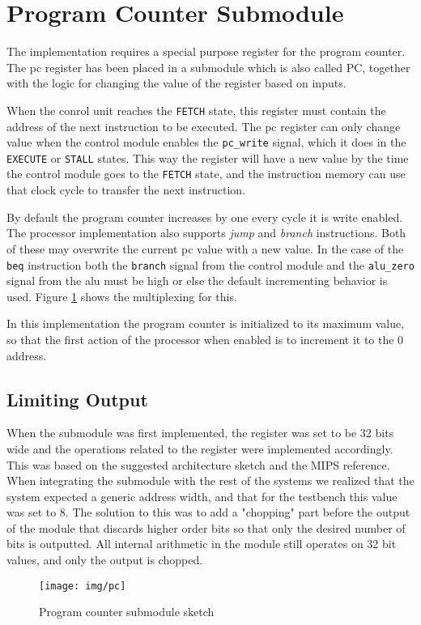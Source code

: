 \section{Program Counter Submodule}
The implementation requires a special purpose register for the program counter.
The \gls{pc} register has been placed in a submodule which is also called PC,
together with the logic for changing the value of the register based on inputs.

When the conrol unit reaches the \texttt{FETCH} state,
this register must contain the address of the next instruction to be executed.
The \gls{pc} register can only change value when the control module enables the \texttt{pc\_write} signal,
which it does in the \texttt{EXECUTE} or \texttt{STALL} states.
This way the register will have a new value by the time the control module goes to the \texttt{FETCH} state,
and the instruction memory can use that clock cycle to transfer the next instruction.

By default the program counter increases by one every cycle it is write enabled.
The processor implementation also supports \textit{jump} and \textit{branch} instructions.
Both of these may overwrite the current \gls{pc} value with a new value.
In the case of the \texttt{beq} instruction both the \texttt{branch} signal from the control module and the \texttt{alu\_zero} signal from the \gls{alu} must be high or else the default incrementing behavior is used.
Figure \ref{fig:pc} shows the multiplexing for this.

In this implementation the program counter is initialized to its maximum value,
so that the first action of the processor when enabled is to increment it to the 0 address.

\subsection{Limiting Output}
When the submodule was first implemented,
the register was set to be 32 bits wide and the operations related to the register were implemented accordingly.
This was based on the suggested architecture sketch and the MIPS reference.
When integrating the submodule with the rest of the systems we realized that the system expected a generic address width,
and that for the testbench this value was set to 8.
The solution to this was to add a "chopping" part before the output of the module that discards higher order bits so that only the desired number of bits is outputted.
All internal arithmetic in the module still operates on 32 bit values,
and only the output is chopped.

\begin{figure}[p]
    \centering
    \texttt{[image: img/pc]}
    \caption{Program counter submodule sketch}
    \label{fig:pc}
\end{figure}

